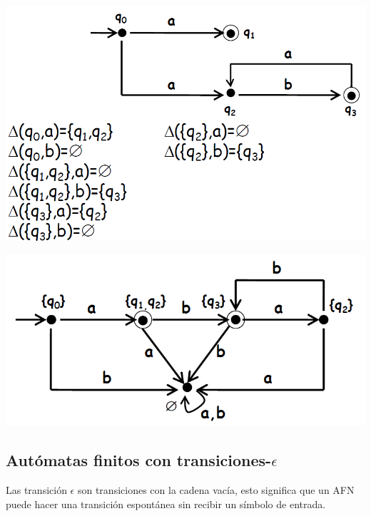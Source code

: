 \documentclass[a4paper,9pt]{extarticle}
\newenvironment{Figure}
  {\par\medskip\noindent\minipage{\linewidth}}
  {\endminipage\par\medskip}
\begin{document}
\begin{multicols*}{2}
\begin{Figure}
 \centering
 \includegraphics[scale=0.3]{AFN_AFD}
\end{Figure}

\begin{Figure}
 \centering
 \includegraphics[scale=0.3]{AFN_equivalente}
\end{Figure}


\subsection{Autómatas finitos con transiciones-$\epsilon$}
Las transición $\epsilon$ son transiciones con la cadena vacía, esto significa que un AFN puede hacer una transición  espontánea sin recibir un símbolo de entrada.


\end{multicols*}
\end{document}
